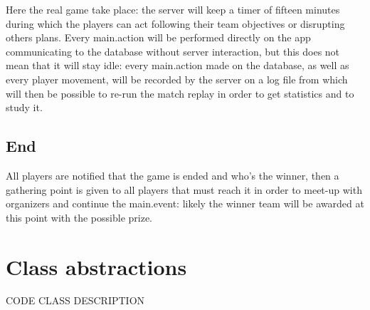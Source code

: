 				Here the real game take place: the server will keep a timer of fifteen minutes during which the players can act following their team objectives or disrupting others plans.
				Every main.action will be performed directly on the app communicating to the database without server interaction, but this does not mean that it will stay idle: every main.action made on the database, as well as every player movement, will be recorded by the server on a log file from which will then be possible to re-run the match replay in order to get statistics and to study it.
			
		\subsection{End}
		
			All players are notified that the game is ended and who's the winner, then a gathering point is given to all players that must reach it in order to meet-up with organizers and continue the main.event: likely the winner team will be awarded at this point with the possible prize.
			
	\section{Class abstractions}
	
		CODE CLASS DESCRIPTION